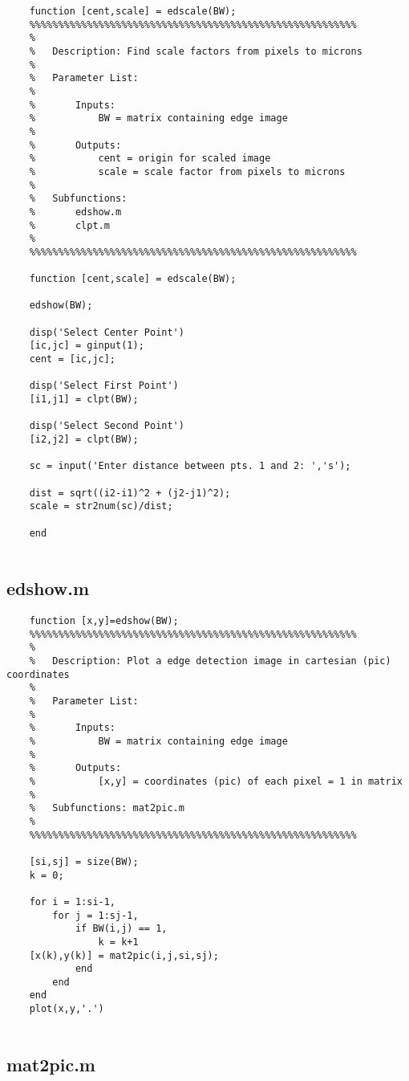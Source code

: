 \begin{lstlisting}
	function [cent,scale] = edscale(BW);
	%%%%%%%%%%%%%%%%%%%%%%%%%%%%%%%%%%%%%%%%%%%%%%%%%%%%%%%%%
	%
	%	Description: Find scale factors from pixels to microns
	%
	%	Parameter List:
	%
	%		Inputs:
	%			BW = matrix containing edge image
	%
	%		Outputs:
	%			cent = origin for scaled image
	%			scale = scale factor from pixels to microns
	%
	%	Subfunctions:
	%		edshow.m
	%		clpt.m
	%
	%%%%%%%%%%%%%%%%%%%%%%%%%%%%%%%%%%%%%%%%%%%%%%%%%%%%%%%%%
	
	function [cent,scale] = edscale(BW);
	
	edshow(BW);
	
	disp('Select Center Point')
	[ic,jc] = ginput(1);
	cent = [ic,jc];
	
	disp('Select First Point')
	[i1,j1] = clpt(BW);
	
	disp('Select Second Point')
	[i2,j2] = clpt(BW);
	
	sc = input('Enter distance between pts. 1 and 2: ','s');
	
	dist = sqrt((i2-i1)^2 + (j2-j1)^2);
	scale = str2num(sc)/dist;
	
	end
	
\end{lstlisting}

\newpage

\subsection{edshow.m}

\begin{lstlisting}
	function [x,y]=edshow(BW);
	%%%%%%%%%%%%%%%%%%%%%%%%%%%%%%%%%%%%%%%%%%%%%%%%%%%%%%%%%
	%
	%	Description: Plot a edge detection image in cartesian (pic) coordinates
	%
	%	Parameter List:
	%
	%		Inputs:
	%			BW = matrix containing edge image
	%
	%		Outputs:
	%			[x,y] = coordinates (pic) of each pixel = 1 in matrix
	%
	%	Subfunctions: mat2pic.m
	%
	%%%%%%%%%%%%%%%%%%%%%%%%%%%%%%%%%%%%%%%%%%%%%%%%%%%%%%%%%
	
	[si,sj] = size(BW);
	k = 0;
	
	for i = 1:si-1,
		for j = 1:sj-1,
			if BW(i,j) == 1,
				k = k+1
	[x(k),y(k)] = mat2pic(i,j,si,sj);
			end
		end
	end
	plot(x,y,'.')
	
\end{lstlisting}

\newpage

\subsection{mat2pic.m}

